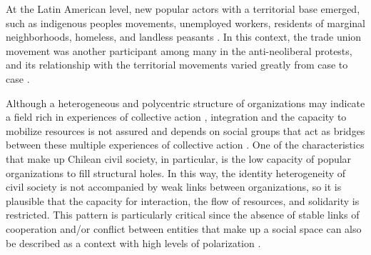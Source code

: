 At the Latin American level, new popular actors with a territorial base emerged, such as indigenous peoples movements, unemployed workers, residents of marginal neighborhoods, homeless, and landless peasants \parencite{merklen_pobres_2010, rossi_second_2015, seoane_nuevas_2006, svampa_movimientos_2010}. In this context, the trade union movement was another participant among many in the anti-neoliberal protests, and its relationship with the territorial movements varied greatly from case to case \parencite{silva_challenging_2009}.
\bigskip

Although a heterogeneous and polycentric structure of organizations may indicate a field rich in experiences of collective action \parencite{programa_de_las_naciones_unidas_para_el_desarrollo_desarrollo_2000}, integration and the capacity to mobilize resources is not assured and depends on social groups that act as bridges between these multiple experiences of collective action \parencite{baldassarri_integrative_2007, granovetter_strength_1973}. One of the characteristics that make up Chilean civil society, in particular, is the low capacity of popular organizations to fill structural holes. In this way, the identity heterogeneity of civil society is not accompanied by weak links between organizations, so it is plausible that the capacity for interaction, the flow of resources, and solidarity is restricted. This pattern is particularly critical since the absence of stable links of cooperation and/or conflict between entities that make up a social space can also be described as a context with high levels of polarization \parencite{aref_detecting_2020}.
\bigskip

